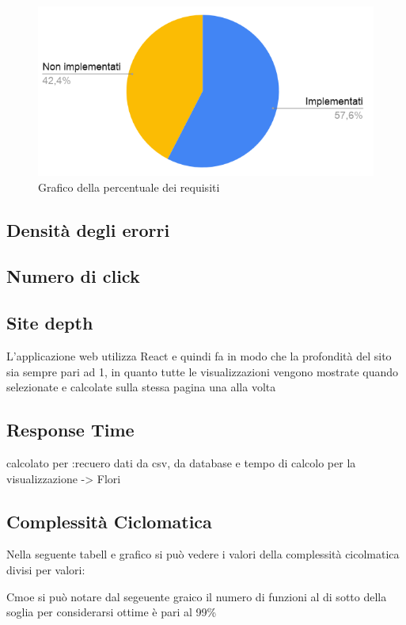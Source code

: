 \begin{figure}[H]
    \centering
    \includegraphics[width=10 cm]{source/sections/images/torta-requisiti.png}
    \caption{Grafico della percentuale dei requisiti}
\end{figure}

\subsection{Densità degli erorri}
\subsection{Numero di click}
\subsection{Site depth}
L'applicazione web utilizza React e quindi fa in modo che la profondità del sito sia sempre pari ad 1, in quanto tutte le visualizzazioni vengono mostrate quando selezionate e calcolate sulla stessa pagina una alla volta

\subsection{Response Time}
calcolato per :recuero dati da csv, da database e tempo di calcolo per la visualizzazione -> Flori

\subsection{Complessità Ciclomatica}
Nella seguente tabell e grafico si può vedere i valori della complessità cicolmatica divisi per valori:

    Cmoe si può notare dal segeuente graico il numero di funzioni al di sotto della soglia per considerarsi ottime è pari al 99\%


